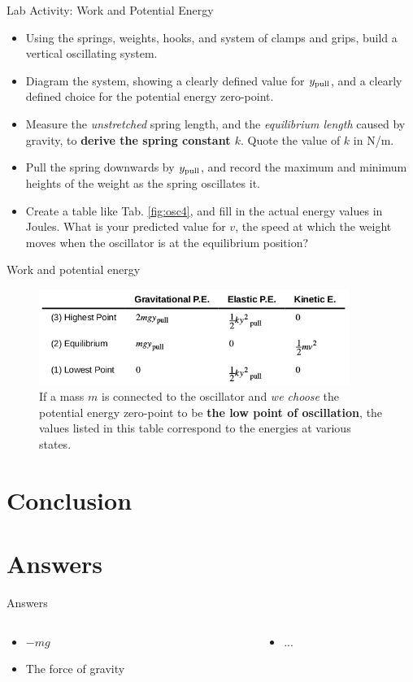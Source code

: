 \documentclass{beamer}
\begin{document}
\begin{frame}{Lab Activity: Work and Potential Energy}
\small
\begin{itemize}
\item Using the springs, weights, hooks, and system of clamps and grips, build a vertical oscillating system.
\item Diagram the system, showing a clearly defined value for $y_{\rm pull}$, and a clearly defined choice for the potential energy zero-point.
\item Measure the \textit{unstretched} spring length, and the \textit{equilibrium length} caused by gravity, to \textbf{derive the spring constant $k$}.  Quote the value of $k$ in N/m.
\item Pull the spring downwards by $y_{\rm pull}$, and record the maximum and minimum heights of the weight as the spring oscillates it.
\item Create a table like Tab. \ref{fig:osc4}, and fill in the actual energy values in Joules.  What is your predicted value for $v$, the speed at which the weight moves when the oscillator is at the equilibrium position?
\end{itemize}
\end{frame}

\begin{frame}{Work and potential energy}
\begin{figure}
\centering
\includegraphics[width=0.9\textwidth,trim=0cm 0.1cm 0cm 0cm,clip=true]{figures/table.png}
\caption{\label{fig:osc5} If a mass $m$ is connected to the oscillator and \textit{we choose} the potential energy zero-point to be \textbf{the low point of oscillation}, the values listed in this table correspond to the energies at various states.}
\end{figure}
\end{frame}

\section{Conclusion}

\section{Answers}

\begin{frame}{Answers}
\begin{columns}[T]
\begin{column}{0.5\textwidth}
\begin{itemize}
\item $-mg$
\item The force of gravity 
\end{itemize}
\end{column}
\begin{column}{0.5\textwidth}
\begin{itemize}
\item ...
\end{itemize}
\end{column}
\end{columns}
\end{frame}
\end{document}
